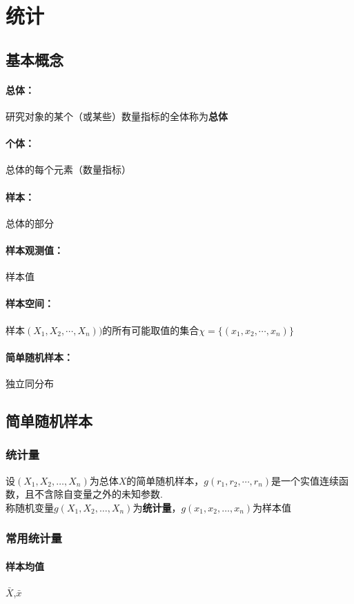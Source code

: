 \documentclass[a4paper]{ctexart}
\begin{document}
\section{统计}
\subsection{基本概念}
\paragraph{总体：}研究对象的某个（或某些）数量指标的全体称为\textbf{总体}
\paragraph{个体：}总体的每个元素（数量指标）
\paragraph{样本：}总体的部分
\paragraph{样本观测值：}样本值
\paragraph{样本空间：}样本$(X_1,X_2,\cdots,X_n))$的所有可能取值的集合$\chi=\{(x_1,x_2,\cdots,x_n)\}$
\paragraph{简单随机样本：}独立同分布
\subsection{简单随机样本}
\subsubsection{统计量}
设$(X_1,X_2,\ldots,X_n)$为总体$X$的简单随机样本，$g(r_1,r_2,\cdots,r_n)$是一个实值连续函数，且不含除自变量之外的未知参数.\\
称随机变量$g(X_1,X_2,\ldots,X_n)$为\textbf{统计量}，$g(x_1,x_2,\ldots,x_n)$为样本值
\subsubsection{常用统计量}
\paragraph{样本均值} $\bar X$,$\bar x$
\end{document}

